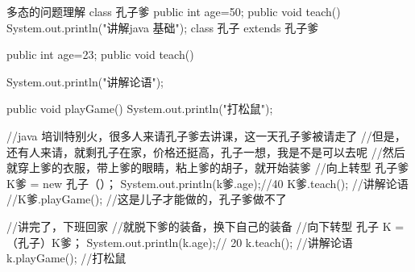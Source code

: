 多态的问题理解
class 孔子爹{
	public int age=50;
	public void teach(){
	System.out.println("讲解java 基础");
	}
}
class 孔子 extends 孔子爹{
	public int age=23;
	public void teach(){
	System.out.println("讲解论语");

	}
	public void playGame(){
	System.out.println("打松鼠");
	}
}

//java 培训特别火，很多人来请孔子爹去讲课，这一天孔子爹被请走了
//但是，还有人来请，就剩孔子在家，价格还挺高，孔子一想，我是不是可以去呢
//然后就穿上爹的衣服，带上爹的眼睛，粘上爹的胡子，就开始装爹
//向上转型
孔子爹  K爹 = new 孔子（）；
System.out.println(k爹.age);//40
K爹.teach();  //讲解论语
//K爹.playGame();    //这是儿子才能做的，孔子爹做不了


//讲完了，下班回家
//就脱下爹的装备，换下自己的装备
//向下转型
孔子 K = （孔子）K爹；
System.out.println(k.age);//  20
k.teach();    //讲解论语
k.playGame();   //打松鼠

